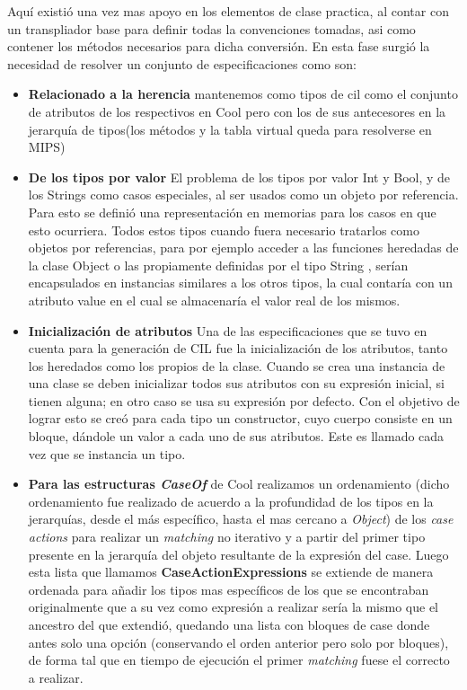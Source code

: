 \documentclass[a4paper,10pt,twocolumn]{article}
\begin{document}
  Aquí existió una vez mas apoyo en los elementos de clase practica, al contar con un transpliador base para definir todas la convenciones tomadas, asi como contener los métodos necesarios para dicha conversión.
 En esta fase surgió la necesidad de resolver  un conjunto de especificaciones como son: 
	\begin{itemize}
		\item \textbf{Relacionado a la herencia} mantenemos como tipos de cil como el conjunto de atributos de los respectivos en Cool pero con los de sus antecesores en la jerarqu\'ia de tipos(los m\'etodos y la tabla virtual queda para resolverse en MIPS)
		\item \textbf{De los tipos por valor} El problema de los tipos por valor  Int y	Bool, y de los  Strings como casos especiales, al ser usados como un objeto por referencia. Para esto se definió una representación en memorias para los casos en
		que esto ocurriera. Todos estos tipos cuando fuera necesario tratarlos como objetos
		por referencias, para por ejemplo acceder a las funciones heredadas de la clase
		Object o las propiamente definidas por el tipo String , serían encapsulados en
		instancias similares a los otros tipos, la cual contaría con un atributo value en el cual
		se almacenaría el valor real de los mismos.
		\item \textbf{Inicializaci\'on de atributos} Una de las especificaciones que se tuvo en cuenta para la generación de CIL fue la inicialización
		de los atributos, tanto los heredados como los propios de la clase. Cuando se crea una instancia
		de una clase se deben inicializar todos sus atributos con su expresión inicial, si tienen alguna;
		en otro caso se usa su expresión por defecto. Con el objetivo de lograr esto se creó para cada
		tipo un constructor, cuyo cuerpo consiste en un bloque, dándole un valor a cada uno de sus
		atributos. Este es llamado cada vez que se instancia un tipo.
		\item \textbf{Para las estructuras \textit{CaseOf}} de Cool realizamos un ordenamiento (dicho ordenamiento fue realizado de acuerdo a la profundidad de los tipos en la jerarqu\'ias, desde el m\'as espec\'ifico, hasta el mas cercano a \textit{Object}) de los \textit{case actions} para realizar un \textit{matching} no iterativo y a partir del primer tipo presente en la jerarqu\'ia del objeto resultante de la expresi\'on del case.
		Luego esta lista que llamamos \textbf{CaseActionExpressions} se extiende de manera ordenada para a\~nadir los tipos mas espec\'ificos de los que se encontraban originalmente que a su vez como expresi\'on a realizar ser\'ia la mismo que el ancestro del que extendió, quedando una lista con bloques de case donde antes solo una opci\'on (conservando el orden anterior pero solo por bloques), de forma tal que en tiempo de ejecuci\'on el primer \textit{matching} fuese el correcto a realizar.
	\end{itemize}
\end{document}
